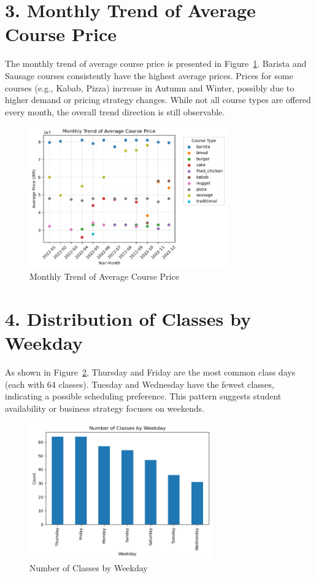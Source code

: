 \documentclass[12pt,a4paper]{article}
\begin{document}
\section*{3. Monthly Trend of Average Course Price}

The monthly trend of average course price is presented in Figure~\ref{fig:avg-course-price}. Barista and Sausage courses consistently have the highest average prices. Prices for some courses (e.g., Kabab, Pizza) increase in Autumn and Winter, possibly due to higher demand or pricing strategy changes. While not all course types are offered every month, the overall trend direction is still observable.

\begin{figure}[h!]
    \centering
    \includegraphics[width=0.76\textwidth]{Monthly Trend of Average Course Price.png}
    \caption{Monthly Trend of Average Course Price}
    \label{fig:avg-course-price}
\end{figure}

\section*{4. Distribution of Classes by Weekday}

As shown in Figure~\ref{fig:weekday-classes}, Thursday and Friday are the most common class days (each with 64 classes). Tuesday and Wednesday have the fewest classes, indicating a possible scheduling preference. This pattern suggests student availability or business strategy focuses on weekends.

\begin{figure}[h!]
    \centering
    \includegraphics[width=0.7\textwidth]{Number of Classes by Weekday.png}
    \caption{Number of Classes by Weekday}
    \label{fig:weekday-classes}
\end{figure}
\end{document}
